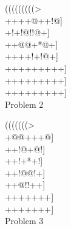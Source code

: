 \documentclass[mcrownvopaper,10pt,twopage,onecolumn,draft,showtrims]{memoir}
\begin{document}
\begin{figure}[ht]
    \begin{minipage}[c]{0.50\linewidth}
        \centering    
        {\gnos%
        (((((((((>\\
        ++++@++!@]\\
        +!+!@!!@+]\\
        ++@@+*@+]\\
        ++++!+!@+]\\
        +++++++++]\\
        +++++++++]\\
        +++++++++]\\
        }
        Problem 2
    \end{minipage}%
    \begin{minipage}[c]{0.50\linewidth}
        \centering    
        {\gnos%
        (((((((>\\
        +@@+++@]\\
        ++!@+@!]\\
        ++!+*+!]\\
        ++!@@!+]\\
        ++@!!++]\\
        +++++++]\\
        +++++++]\\
        }
        Problem 3
    \end{minipage}%
\end{figure}  
\newpage
\end{document}
